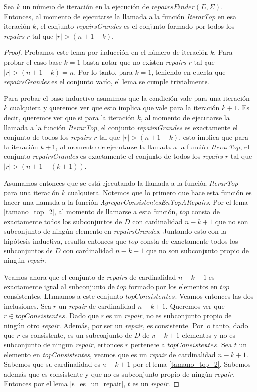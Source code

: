 \documentclass[11pt,a4paper,twoside]{tesis}
\begin{document}
\begin{lemma}\label{repairs_grandes_agregados}
Sea $k$ un número de iteración en la ejecución de $repairsFinder(D, \Sigma)$. Entonces, al momento de ejecutarse la llamada a la función \textit{IterarTop} en esa iteración $k$, el conjunto \textit{repairsGrandes} es el conjunto formado por todos los \textit{repairs} $r$ tal que $|r| > (n + 1 - k)$.
\end{lemma}

\begin{proof}
Probamos este lema por inducción en el número de iteración $k$. Para probar el caso base $k=1$ basta notar que no existen \textit{repairs} $r$ tal que $|r| > (n + 1 - k) = n$. Por lo tanto, para $k=1$, teniendo en cuenta que \textit{repairsGrandes} es el conjunto vacío, el lema se cumple trivialmente.

Para probar el paso inductivo asumimos que la condición vale para una iteración $k$ cualquiera y queremos ver que esto implica que vale para la iteración $k+1$. Es decir, queremos ver que si para la iteración $k$, al momento de ejecutarse la llamada a la función \textit{IterarTop}, el conjunto \textit{repairsGrandes} es exactamente el conjunto de todos los \textit{repairs} $r$ tal que  $|r| > (n + 1 - k)$, esto implica que para la iteración $k+1$, al momento de ejecutarse la llamada a la función \textit{IterarTop}, el conjunto \textit{repairsGrandes} es exactamente el conjunto de todos los \textit{repairs} $r$ tal que  $|r| > (n + 1 - (k+1))$.


Asumamos entonces que se está ejecutando la llamada a la función \textit{IterarTop} para una iteración $k$ cualquiera. Notemos que lo primero que hace esta función es hacer una llamada a la función \textit{AgregarConsistentesEnTopARepairs}. Por el lema \ref{tamano_top_2}, al momento de llamarse a esta función, $top$ consta de exactamente todos los subconjuntos de $D$ con cardinalidad $n - k + 1$ que no son subconjunto de ningún elemento en \textit{repairsGrandes}. Juntando esto con la hipótesis inductiva, resulta entonces que $top$ consta de exactamente todos los subconjuntos de $D$ con cardinalidad $n - k + 1$ que no son subconjunto propio de ningún \textit{repair}. 

Veamos ahora que el conjunto de \textit{repairs} de cardinalidad $n-k+1$ es exactamente igual al subconjunto de $top$ formado por los elementos en $top$ consistentes. Llamamos a este conjunto $topConsistentes$. Veamos entonces las dos inclusiones.
Sea $r$ un \textit{repair} de cardinalidad $n-k+1$. Queremos ver que $r \in topConsistentes$. Dado que $r$ es un \textit{repair}, no es subconjunto propio de ningún otro \textit{repair}. Además, por ser un \textit{repair}, es consistente. Por lo tanto, dado que $r$ es consistente, es un subconjunto de $D$ de $n-k+1$ elementos y no es subconjunto de ningun \textit{repair}, entonces $r$ pertenece a $topConsistentes$.
Sea $t$ un elemento en \textit{topConsistentes}, veamos que es un \textit{repair} de cardinalidad $n-k+1$. Sabemos que su cardinalidad es $n-k+1$ por el lema \ref{tamano_top_2}. Sabemos además que es consistente y que no es subconjunto propio de ningún \textit{repair}. Entonces por el lema \ref{s_es_un_repair}, $t$ es un \textit{repair}.


\end{proof}
\end{document}
